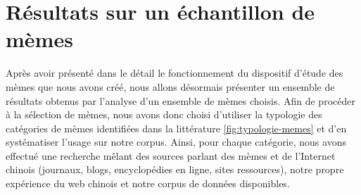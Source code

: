 \section{Résultats sur un échantillon de mèmes}
\label{sec:results-memes}

Après avoir présenté dans le détail le fonctionnement du dispositif d'étude des mèmes que nous avons créé, nous allons désormais présenter un ensemble de résultats obtenus par l'analyse d'un ensemble de mèmes choisis. Afin de procéder à la sélection de mèmes, nous avons donc choisi d{\textquoteright}utiliser la typologie des catégories de mèmes identifiées dans la littérature \ref{fig:typologie-memes} et d{\textquoteright}en systématiser l{\textquoteright}usage sur notre corpus. Ainsi, pour chaque catégorie, nous avons effectué une recherche m\^elant des sources parlant des mèmes et de l{\textquoteright}Internet chinois (journaux, blogs, encyclopédies en ligne, sites ressources), notre propre expérience du web chinois et notre corpus de données disponibles. 

